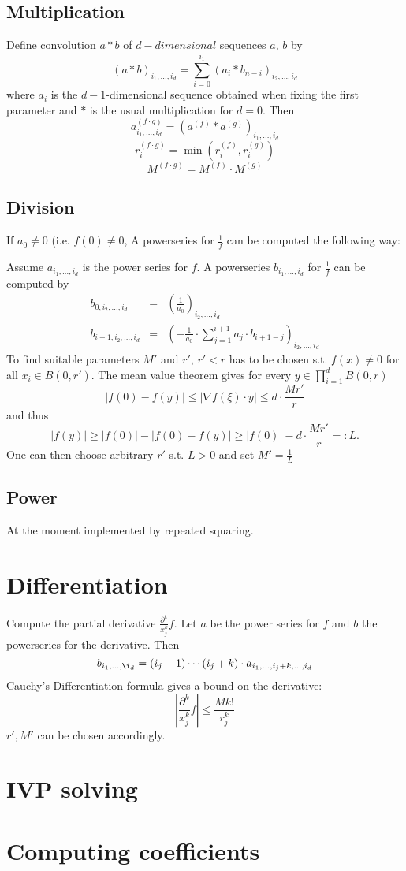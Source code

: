 \documentclass[]{article}
\newcommand{\abs}[1]{\left|#1\right|}
\begin{document}
\subsection{Multiplication}
Define convolution $a * b$ of $d-dimensional$ sequences $a$, $b$ by 
$$ (a * b)_{i_1, \dots, i_d} = \sum_{i=0}^{i_1} (a_i * b_{n-i})_{i_2, \dots, i_d} $$
where $a_i$ is the $d-1$-dimensional sequence obtained when fixing the first parameter and $*$ is the usual multiplication for $d=0$.
Then
$$a^{(f \cdot g)}_{i_1,\dots,i_d} = (a^{(f)}*a^{(g)})_{i_1, \dots, i_d}$$
$$r_i^{(f \cdot g)} = \min(r_i^{(f)}, r_i^{(g)}) $$
$$M^{(f \cdot g)} = M^{(f)} \cdot M^{(g)}$$
\subsection{Division}
If $a_0 \neq 0$ (i.e. $f(0) \neq 0$, A powerseries for $\frac{1}{f}$ can be computed the following way:

Assume $a_{i_1,\dots, i_d}$ is the power series for $f$. 
A powerseries $b_{i_1,\dots, i_d}$ for $\frac{1}{f}$ can be computed by
\begin{eqnarray*}
b_{0, i_2, \dots, i_d} &=& \left(\frac{1}{a_0}\right)_{i_2, \dots, i_d} \\
b_{i+1, i_2, \dots, i_d} &=& \left( -\frac{1}{a_0} \cdot \sum_{j=1}^{i+1}a_j \cdot b_{i+1-j}\right)_{i_2,\dots,i_d}
\end{eqnarray*}
To find suitable parameters $M'$ and $r'$, $r'<r$ has to be chosen s.t. $f(x) \neq 0$ for all $x_i \in B(0, r')$. 
The mean value theorem gives for every $y \in \prod_{i=1}^d B(0, r)$
$$ \abs{f(0)-f(y)} \leq \abs{\nabla f(\xi) \cdot y} \leq d \cdot \frac{Mr'}{r}$$
and thus
\begin{equation*}\label{divlowerbound}
\abs{f(y)} \geq \abs{f(0)}-\abs{f(0)-f(y)} \geq \abs{f(0)}-d\cdot \frac{Mr'}{r} =: L.
\end{equation*}
One can then choose arbitrary $r'$ s.t. $L > 0$ and set $M' = \frac{1}{L}$
\subsection{Power}
At the moment implemented by repeated squaring.
\section{Differentiation}
Compute the partial derivative $\frac{\partial^k}{x_j^k}f$.
Let $a$ be the power series for $f$ and $b$ the powerseries for the derivative.
Then
$$ b_{i_1,\dots, \i_d} = (i_j+1) \cdots (i_j+k) \cdot a_{i_1, \dots, i_j+k, \dots, i_d} $$
Cauchy's Differentiation formula gives a bound on the derivative:
$$\abs{\frac{\partial^k}{x_j^k}f} \leq \frac{Mk!}{r_j^k}$$
$r', M'$ can be chosen accordingly.
\section{IVP solving}
\section{Computing coefficients}
\end{document}

